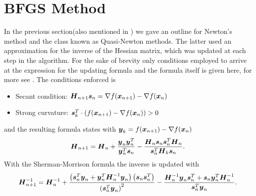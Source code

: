 \section{BFGS Method\label{sec:BFGS}}
    In the previous section(also mentioned in ) we gave an
    outline for Newton's method and the class known as Quasi-Newton methods.
    The latter used an approximation for the inverse of the Hessian matrix,
    which was updated at each step in the algorithm. For the sake of brevity
    only conditions employed to arrive at the expression for the updating
    formula and the formula itself is given here, for more see \cite{BFGSB,
    BFGSF, BFGSG, BFGSS, numOptNocWrig}. The conditions enforced is
        \begin{itemize}
            \item Secant condition: $\boldsymbol{{H}}_{n+1} \boldsymbol{{s}}_n = \nabla
                f(\boldsymbol{{x}}_{n+1}) - \nabla f(\boldsymbol{{x}}_n)$
            \item Strong curvature: $\boldsymbol{{s}}^T_k\cdot (f(\boldsymbol{{x}}_{n+1}) -
                \nabla f(\boldsymbol{{x}}_n)) > 0$
        \end{itemize}
    and the resulting formula states with $\boldsymbol{{y}}_k = f(\boldsymbol{{x}}_{n+1}) -
    \nabla f(\boldsymbol{{x}}_n)$
        \begin{equation}
            \boldsymbol{{H}}_{n+1} = \boldsymbol{{H}}_n +
            \frac{\boldsymbol{{y}}_n\boldsymbol{{y}}^T_n}{\boldsymbol{{y}}^T_n \boldsymbol{{s}}_n} -
            \frac{\boldsymbol{{H}}_n\boldsymbol{{s}}_n\boldsymbol{{s}}^T_n\boldsymbol{{H}}_n}
            {\boldsymbol{{s}}^T_n\boldsymbol{{H}}_k\boldsymbol{{s}}_n}.
            \label{eq:BFGSdef}
        \end{equation}
    With the Sherman-Morrison formula\cite{shermorInv} the inverse is updated
    with
        \begin{equation}
            \boldsymbol{{H}}^{-1}_{n+1} = \boldsymbol{{H}}^{-1}_n +
            \frac{\left(\boldsymbol{{s}}^T_n\boldsymbol{{y}}_n +
            \boldsymbol{{y}}^T_n\boldsymbol{{H}}^{-1}_n\boldsymbol{{y}}_n\right)
            \left(\boldsymbol{{s}}_n\boldsymbol{{s}}^T_n\right)}
            {\left(\boldsymbol{{s}}^T_n\boldsymbol{{y}}_n\right)^2} -
            \frac{\boldsymbol{{H}}^{-1}_n\boldsymbol{{y}}_n\boldsymbol{{s}}^T_n +
            \boldsymbol{{s}}_n\boldsymbol{{y}}^T_n\boldsymbol{{H}}^{-1}_n}{\boldsymbol{{s}}^T_n\boldsymbol{{y}}_n}.
            \label{eq:shermanmorrisondef}
        \end{equation}

